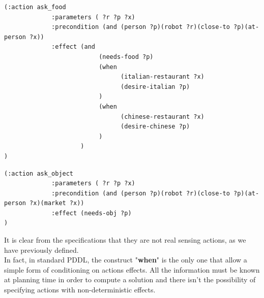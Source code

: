 \documentclass[pdftex,12pt,a4paper]{report}
\begin{document}
\begin{verbatim}
(:action ask_food
             :parameters ( ?r ?p ?x)
             :precondition (and (person ?p)(robot ?r)(close-to ?p)(at-person ?x))
             :effect (and
                          (needs-food ?p)
                          (when
                                (italian-restaurant ?x)
                                (desire-italian ?p)
                          )
                          (when
                                (chinese-restaurant ?x)
                                (desire-chinese ?p)
                          )
                     )
)
\end{verbatim}

\begin{verbatim}
(:action ask_object 
             :parameters ( ?r ?p ?x)
             :precondition (and (person ?p)(robot ?r)(close-to ?p)(at-person ?x)(market ?x))
             :effect (needs-obj ?p)
)
\end{verbatim}

\noindent It is clear from the specifications that they are not real sensing actions, as we have previously defined.\\ 
In fact, in standard PDDL, the construct "\textbf{when}" is the only one that allow a simple form of conditioning on actions effects. 
All the information must be known at planning time in order to compute a solution and there isn't the possibility of specifying actions with non-deterministic effects.
\end{document}
